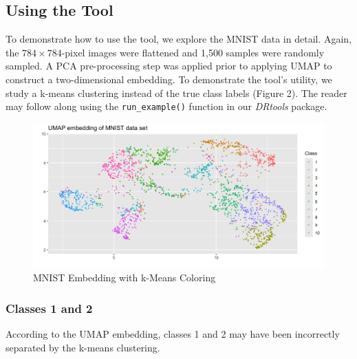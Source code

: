 \documentclass{article}
\begin{document}
\subsection{Using the Tool}
To demonstrate how to use the tool, we explore the MNIST data in detail. Again, the $784 \times 784$-pixel images were flattened and 1,500 samples were randomly sampled. A PCA pre-processing step was applied prior to applying UMAP \cite{UMAP} to construct a two-dimensional embedding. To demonstrate the tool's utility, we study a k-means clustering instead of the true class labels (Figure 2). The reader may follow along using the \texttt{run\_example()} function in our \textit{DRtools} package.

\renewcommand{\figurename}{Figure}
\renewcommand{\thefigure}{2}
\begin{figure}[!t]
\centering
\includegraphics[scale=0.45]{MNIST kmeans}
\caption{MNIST Embedding with k-Means Coloring}
\end{figure}

\subsubsection{Classes 1 and 2}
According to the UMAP embedding, classes 1 and 2 may have been incorrectly separated by the k-means clustering.

\newpage
\end{document}
